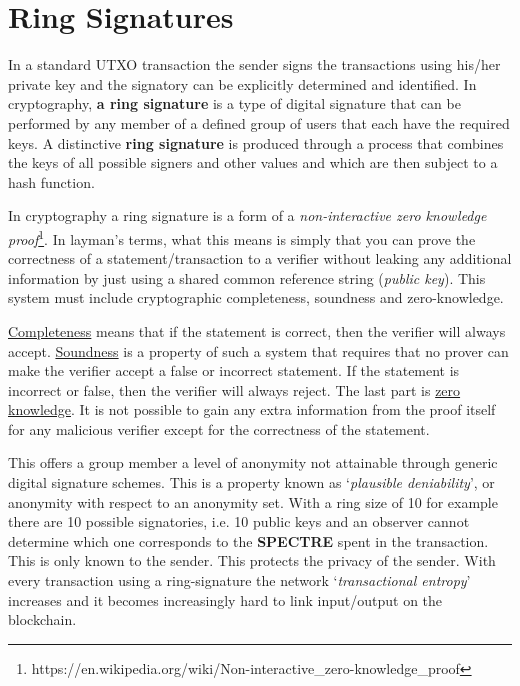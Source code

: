 \section{Ring Signatures}
In a standard UTXO transaction the sender signs the transactions using his/her
private key and the signatory can be explicitly determined and identified. In
cryptography, \textbf{a ring signature} is a type of digital signature that can be
performed by any member of a defined group of users that each have the required
keys. A distinctive \textbf{ring signature} is produced through a process that combines
the keys of all possible signers and other values and which are then subject to
a hash function.



In cryptography a ring signature is a form of a \textit{non-interactive 
zero knowledge proof}\footnote{https://en.wikipedia.org/wiki/Non-interactive\_zero-knowledge\_proof}. 
In layman’s terms, what this means is simply that you can prove the
correctness of a statement/transaction to a verifier without leaking any additional
information by just using a shared common reference string (\textit{public key}).
This system must include cryptographic completeness, soundness and zero-knowledge.



\underline{Completeness} means that if the statement is correct, then the verifier will
always accept. \underline{Soundness} is a property of such a system that requires that
no prover can make the verifier accept a false or incorrect statement. If the
statement is incorrect or false, then the verifier will always reject. The
last part is \underline{zero knowledge}. It is not possible to gain any extra information
from the proof itself for any malicious verifier except for the correctness of
the statement.



This offers a group member a level of anonymity not attainable through generic
digital signature schemes. This is a property known as ‘\textit{plausible deniability}’,
or anonymity with respect to an anonymity set. With a ring size of 10 for example
there are 10 possible signatories, i.e. 10 public keys and an observer cannot
determine which one corresponds to the \textbf{SPECTRE} spent in the transaction. This
is only known to the sender. This protects the privacy of the sender. With every
transaction using a ring-signature the network ‘\textit{transactional entropy}’ increases
and it becomes increasingly hard to link input/output on the blockchain.



